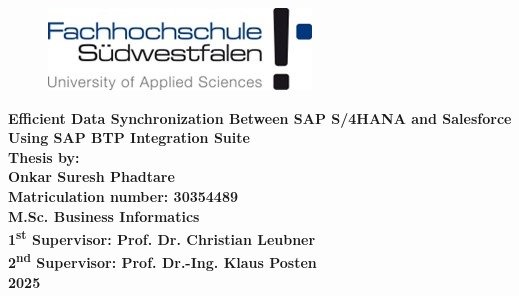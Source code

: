\begin{titlepage}

\begin{figure}[H]
\centering
\includegraphics{Title/logo.jpg}
\caption*{}
\label{fig:entropy} 
\end{figure}

\centering
\LARGE{\textbf{ 
        Efficient Data Synchronization Between SAP S/4HANA and Salesforce Using SAP BTP Integration Suite}}\\[2.5in]



        \large{\textbf{Thesis by:}}\\[0.2cm]
        \large{\textbf{Onkar Suresh Phadtare}}\\[0.2cm]
        \large{\textbf{Matriculation number: 30354489}}\\[1.5cm]

\textbf{M.Sc. Business Informatics}\\[0.5in]

\textbf{{1\textsuperscript{st} Supervisor: Prof. Dr. Christian Leubner}}\\[0.25in]
\textbf{{2\textsuperscript{nd} Supervisor: Prof. Dr.-Ing. Klaus Posten}}\\[0.25in]


\textbf{2025}
\newpage
\end{titlepage}